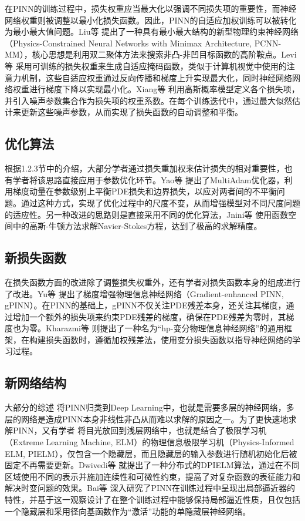 在PINN的训练过程中，损失权重应当最大化以强调不同损失项的重要性，而神经网络权重则被调整以最小化损失函数。因此，PINN的自适应加权训练可以被转化为最小最大值问题。Liu等 \cite{liu2021dual}提出了一种具有最小最大结构的新型物理约束神经网络（Physics-Constrained Neural Networks with Minimax Architecture, PCNN-MM），核心思想是利用双二聚体方法来搜索非凸-非凹目标函数的高阶鞍点。Levi等 \cite{mcclenny2020self}采用可训练的损失权重来生成自适应掩码函数，类似于计算机视觉中使用的注意力机制，这些自适应权重通过反向传播和梯度上升实现最大化，同时神经网络网络权重进行梯度下降以实现最小化。Xiang等 \cite{xiang2022self}利用高斯概率模型定义各个损失项，并引入噪声参数集合作为损失项的权重系数。在每个训练迭代中，通过最大似然估计来更新这些噪声参数，从而实现了损失函数的自动调整和平衡。

\subsection{优化算法}

根据1.2.3节中的介绍，大部分学者通过损失重加权来估计损失的相对重要性，也有学者将该思路直接应用于参数优化环节。Yao等 \cite{yao2023multiadam}提出了MultiAdam优化器，利用梯度动量在参数级别上平衡PDE损失和边界损失，以应对两者间的不平衡问题。通过这种方式，实现了优化过程中的尺度不变，从而增强模型对不同尺度问题的适应性。另一种改进的思路则是直接采用不同的优化算法，Jnini等 \cite{jnini2024gauss}使用函数空间中的高斯-牛顿方法求解Navier-Stokes方程，达到了极高的求解精度。

\subsection{新损失函数}

在损失函数方面的改进除了调整损失权重外，还有学者对损失函数本身的组成进行了改进。Yu等 \cite{yu2022gradient}提出了梯度增强物理信息神经网络（Gradient-enhanced PINN, gPINN）。在PINN的基础上，gPINN不仅关注PDE残差本身，还关注其梯度，通过增加一个额外的损失项来约束PDE残差的梯度，确保在PDE残差为零时，其梯度也为零。Kharazmi等 \cite{kharazmi2021hp}则提出了一种名为“hp-变分物理信息神经网络”的通用框架，在构建损失函数时，遵循加权残差法，使用变分损失函数以指导神经网络的学习过程。

\subsection{新网络结构}

大部分的综述 \cite{lu2021deepxde, 查文舒2022基于神经网络的偏微分方程求解方法研究综述,cuomo2022scientific}将PINN归类到Deep Learning中，也就是需要多层的神经网络，多层的网络是造成PINN本身非线性非凸从而难以求解的原因之一。为了更快速地求解PINN，又有学者 \cite{dwivedi2020physics}将目光放回到浅层网络中，也就是结合了极限学习机（Extreme Learning Machine, ELM）的物理信息极限学习机（Physics-Informed ELM, PIELM），仅包含一个隐藏层，而且隐藏层的输入参数进行随机初始化后被固定不再需要更新。Dwivedi等 \cite{dwivedi2020physics}就提出了一种分布式的DPIELM算法，通过在不同区域使用不同的表示并施加连续性和可微性约束，提高了对复杂函数的表征能力和解决时变问题的效果。Bai等 \cite{bai2023physics}深入研究了PINN在训练过程中呈现出局部逼近器的特性，并基于这一观察设计了在整个训练过程中能够保持局部逼近性质，且仅包括一个隐藏层和采用径向基函数作为“激活”功能的单隐藏层神经网络。

